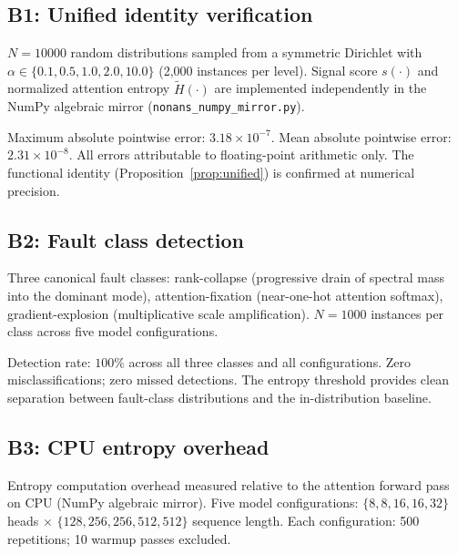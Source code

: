 \documentclass[11pt,a4paper]{article}
\theoremstyle{plain}
\begin{document}
\subsection{B1: Unified identity verification}
\label{sec:b1}

$N = \num{10000}$ random distributions sampled from a symmetric Dirichlet
with $\alpha \in \{0.1, 0.5, 1.0, 2.0, 10.0\}$ (2,000 instances per
level).
Signal score $s(\cdot)$ and normalized attention entropy $\tilde{H}(\cdot)$
are implemented independently in the NumPy algebraic mirror
(\texttt{nonans\_numpy\_mirror.py}).

Maximum absolute pointwise error: $3.18 \times 10^{-7}$.
Mean absolute pointwise error: $2.31 \times 10^{-8}$.
All errors attributable to floating-point arithmetic only.
The functional identity (Proposition~\ref{prop:unified}) is confirmed
at numerical precision.

\subsection{B2: Fault class detection}
\label{sec:b2}

Three canonical fault classes:
rank-collapse (progressive drain of spectral mass into the dominant mode),
attention-fixation (near-one-hot attention softmax),
gradient-explosion (multiplicative scale amplification).
$N = 1000$ instances per class across five model configurations.

Detection rate: $100\%$ across all three classes and all configurations.
Zero misclassifications; zero missed detections.
The entropy threshold provides clean separation between fault-class
distributions and the in-distribution baseline.

\subsection{B3: CPU entropy overhead}
\label{sec:b3}

Entropy computation overhead measured relative to the attention forward
pass on CPU (NumPy algebraic mirror).
Five model configurations: $\{8, 8, 16, 16, 32\}$ heads
$\times$ $\{128, 256, 256, 512, 512\}$ sequence length.
Each configuration: 500 repetitions; 10 warmup passes excluded.
\end{document}
